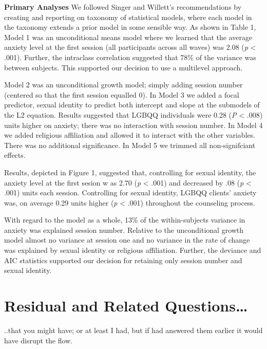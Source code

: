 \documentclass[
  english,
]{book}
\begin{document}
\textbf{Primary Analyses}
We followed Singer and Willett's \citep{singer_applied_2003} recommendations by creating and reporting on taxonomy of statistical models, where each model in the taxonomy extends a prior model in some sensible way. As shown in Table 1, Model 1 was an unconditional means model where we learned that the average anxiety level at the first session (all participants across all waves) was 2.08 (\emph{p} \textless{} .001). Further, the intraclass correlation suggested that 78\% of the variance was between subjects. This supported our decision to use a multilevel approach.

Model 2 was an unconditional growth model; simply adding session number (centered so that the first session equalled 0). In Model 3 we added a focal predictor, sexual identity to predict both intercept and slope at the submodels of the L2 equation. Results suggested that LGBQQ individuals were 0.28 (\emph{P} \textless{} .008) units higher on anxiety; there was no interaction with session number. In Model 4 we added religious affiliation and allowed it to interact with the other variables. There was no additional significance. In Model 5 we trimmed all non-signifciant effects.

Results, depicted in Figure 1, suggested that, controlling for sexual identity, the anxiety level at the first sesion w as 2.70 (\emph{p} \textless{} .001) and decreased by .08 (\emph{p} \textless{} .001) units each session. Controlling for sexual identity, LGBQQ clients' anxiety was, on average 0.29 units higher (\emph{p} \textless{} .001) throughout the counseling process.

With regard to the model as a whole, 13\% of the within-subjects variance in anxiety was explained session number. Relative to the unconditional growth model almost no variance at session one and no variance in the rate of change was explained by sexual identity or religious affiliation. Further, the deviance and AIC statistics supported our decision for retaining only session number and sexual identity.

\hypertarget{residual-and-related-questions-2}{%
\section{Residual and Related Questions\ldots{}}\label{residual-and-related-questions-2}}

..that you might have; or at least I had, but if had answered them earlier it would have disrupt the flow.
\end{document}
